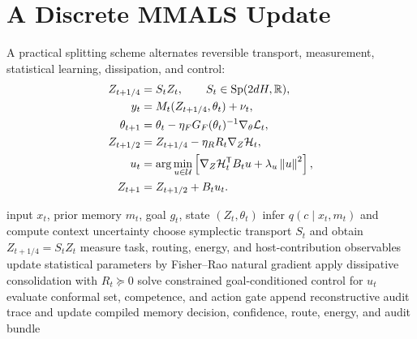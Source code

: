 \documentclass[11pt]{article}
\theoremstyle{definition}\newtheorem{definition}{Definition}\newtheorem{assumption}{Assumption}
\theoremstyle{remark}\newtheorem{remark}{Remark}
\newcommand{\R}{\mathbb{R}}\newcommand{\C}{\mathbb{C}}\newcommand{\E}{\mathbb{E}}
\newcommand{\Sp}{\mathrm{Sp}}\newcommand{\Orth}{\mathrm{O}}\newcommand{\U}{\mathrm{U}}
\newcommand{\norm}[1]{\left\lVert #1\right\rVert}\newcommand{\ip}[2]{\left\langle #1,#2\right\rangle}
\begin{document}
\section{A Discrete MMALS Update}
A practical splitting scheme alternates reversible transport, measurement, statistical learning, dissipation, and control:
\begin{align}
Z_{t+1/4}&=S_tZ_t,\qquad S_t\in\Sp(2dH,\R),\\
y_t&=M_t(Z_{t+1/4},\theta_t)+\nu_t,\\
\theta_{t+1}&=\theta_t-\eta_F G_F(\theta_t)^{-1}\nabla_\theta\mathcal L_t,\\
Z_{t+1/2}&=Z_{t+1/4}-\eta_RR_t\nabla_Z\mathcal H_t,\\
u_t&=\arg\min_{u\in\mathcal U}\left[\nabla_Z\mathcal H_t\T B_tu+\lambda_u\norm{u}^2\right],\\
Z_{t+1}&=Z_{t+1/2}+B_tu_t.
\end{align}

\begin{algorithm}[ht]
\caption{Auditable Symplectic--Dissipative MMALS Step}
\begin{algorithmic}[1]
\Require input $x_t$, prior memory $m_t$, goal $g_t$, state $(Z_t,\theta_t)$
\State infer $q(c\mid x_t,m_t)$ and compute context uncertainty
\State choose symplectic transport $S_t$ and obtain $Z_{t+1/4}=S_tZ_t$
\State measure task, routing, energy, and host-contribution observables
\State update statistical parameters by Fisher--Rao natural gradient
\State apply dissipative consolidation with $R_t\succeq0$
\State solve constrained goal-conditioned control for $u_t$
\State evaluate conformal set, competence, and action gate
\State append reconstructive audit trace and update compiled memory
\State \Return decision, confidence, route, energy, and audit bundle
\end{algorithmic}
\end{algorithm}
\end{document}
